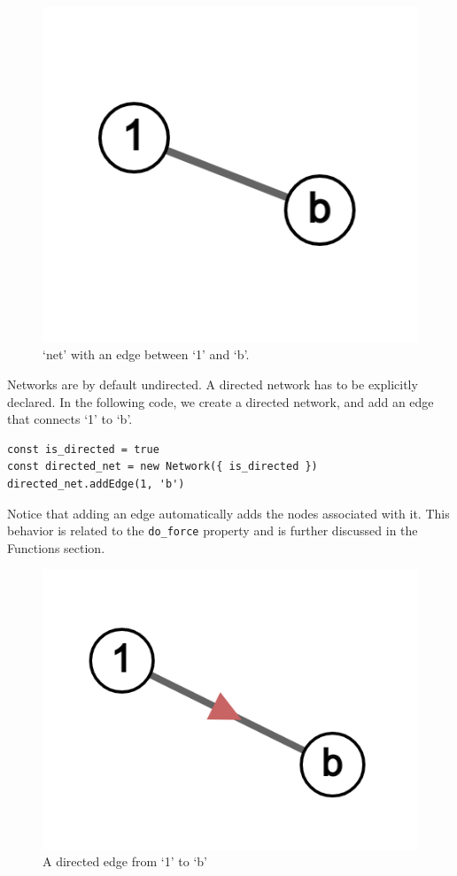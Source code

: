\begin{figure}[H]
  \includegraphics[scale=.25]{img/ex_net_1b.png}
  \caption{`net' with an edge between `1' and `b'.}
  \label{fig:net_1b}
\end{figure}

Networks are by default undirected.
A directed network has to be explicitly declared.
In the following code, we create a directed network,
and add an edge that connects `1' to `b'.

\begin{verbatim}
const is_directed = true
const directed_net = new Network({ is_directed })
directed_net.addEdge(1, 'b')
\end{verbatim}

Notice that adding an edge automatically adds the nodes associated with it.
This behavior is related to the \texttt{do_force} property and
is further discussed in the Functions section.

\begin{figure}[H]
  \includegraphics[scale=.25]{img/ex_net_1b_dir.png}
  \caption{A directed edge from `1' to `b'}
  \label{fig:net_1b_dir}
\end{figure}

